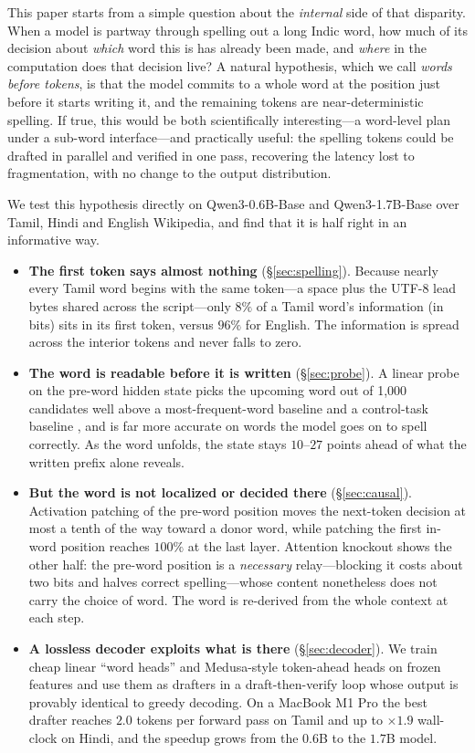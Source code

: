 \documentclass[11pt]{article}
\newcommand{\x}{$\times$}
\begin{document}
This paper starts from a simple question about the \emph{internal} side of that
disparity. When a model is partway through spelling out a long Indic word, how
much of its decision about \emph{which} word this is has already been made, and
\emph{where} in the computation does that decision live? A natural hypothesis,
which we call \emph{words before tokens}, is that the model commits to a whole
word at the position just before it starts writing it, and the remaining tokens
are near-deterministic spelling. If true, this would be both scientifically
interesting---a word-level plan under a sub-word interface---and practically
useful: the spelling tokens could be drafted in parallel and verified in one
pass, recovering the latency lost to fragmentation, with no change to the
output distribution.

We test this hypothesis directly on Qwen3-0.6B-Base and Qwen3-1.7B-Base
\citep{qwen2024} over Tamil, Hindi and English Wikipedia, and find that it is
half right in an informative way.

\begin{itemize}
\item \textbf{The first token says almost nothing} (\S\ref{sec:spelling}).
  Because nearly every Tamil word begins with the same token---a space plus the
  UTF-8 lead bytes shared across the script---only $8\%$ of a Tamil word's
  information (in bits) sits in its first token, versus $96\%$ for English.
  The information is spread across the interior tokens and never falls to zero.
\item \textbf{The word is readable before it is written} (\S\ref{sec:probe}).
  A linear probe on the pre-word hidden state picks the upcoming word out of
  1{,}000 candidates well above a most-frequent-word baseline and a
  control-task baseline \citep{hewitt2019control}, and is far more accurate on
  words the model goes on to spell correctly. As the word unfolds, the state
  stays $10$--$27$ points ahead of what the written prefix alone reveals.
\item \textbf{But the word is not localized or decided there}
  (\S\ref{sec:causal}). Activation patching \citep{meng2022rome,wang2023ioi} of
  the pre-word position moves the next-token decision at most a tenth of the way
  toward a donor word, while patching the first in-word position reaches $100\%$
  at the last layer. Attention knockout shows the other half: the pre-word
  position is a \emph{necessary} relay---blocking it costs about two bits and
  halves correct spelling---whose content nonetheless does not carry the choice
  of word. The word is re-derived from the whole context at each step.
\item \textbf{A lossless decoder exploits what is there}
  (\S\ref{sec:decoder}). We train cheap linear ``word heads'' and Medusa-style
  token-ahead heads \citep{cai2024medusa,gloeckle2024multitoken} on frozen
  features and use them as drafters in a draft-then-verify loop whose output is
  provably identical to greedy decoding. On a MacBook M1 Pro the best drafter
  reaches $2.0$ tokens per forward pass on Tamil and up to \x$1.9$ wall-clock on
  Hindi, and the speedup grows from the $0.6$B to the $1.7$B model.
\end{itemize}
\end{document}
